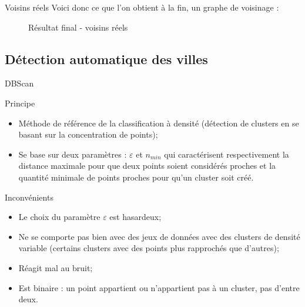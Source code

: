 \begin{frame}{Voisins réels}
    Voici donc ce que l'on obtient à la fin, un graphe de voisinage :
    \begin{figure}
        \caption{\label{fig:result_crit}Résultat final - voisins réels}
    \end{figure}
\end{frame}

\subsection{Détection automatique des villes}
\insertsubsectionframe

\begin{frame}{DBScan}
    \begin{block}{Principe}
        \begin{itemize}
            \item Méthode de référence de la classification à densité (détection de clusters en se basant sur la concentration de points);
            \item Se base sur deux paramètres : $\varepsilon$ et $n_{min}$ qui caractérisent respectivement la distance maximale pour que deux points soient considérés \og proches \fg{} et la quantité minimale de points proches pour qu'un cluster soit créé.
        \end{itemize}
    \end{block}

    \begin{block}{Inconvénients}
        \begin{itemize}
            \item Le choix du paramètre $\varepsilon$ est hasardeux;
            \item Ne se comporte pas bien avec des jeux de données avec des clusters de densité variable (certains clusters avec des points plus rapprochés que d'autres);
            \item Réagit mal au bruit;
            \item Est binaire : un point appartient ou n'appartient pas à un cluster, pas d'entre deux.
        \end{itemize}
    \end{block}
\end{frame}

